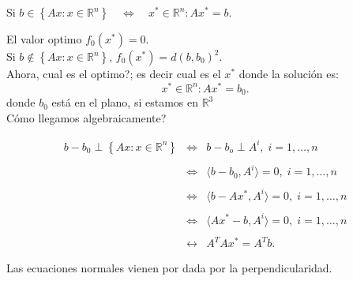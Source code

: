 \begin{ejem}
\begin{center}
\end{center}

Si $b\in \left\{Ax:x\in \mathbb{R}^n\right\}\quad \Leftrightarrow \quad x^* \in \mathbb{R}^n : Ax^* =b.$

El valor optimo $f_0(x^*)=0.$\\

Si $b\notin \left\{Ax:x\in \mathbb{R}^n\right\}$, $f_0(x^*)=d(b,b_0)^2$.\\

Ahora, cual es el optimo?; es decir cual es el $x^*$
donde la solución es:
$$x^*\in \mathbb{R}^n : Ax^*=b_0.$$ donde $b_0$ está en el plano, si estamos en $\mathbb{R}^3$\\

Cómo llegamos algebraicamente?

$$
\begin{array}{rcl}
b-b_0 \perp \left\{Ax:x\in \mathbb{R}^n\right\}&\Leftrightarrow & b-b_o \perp A^i,\; i=1,\ldots,n\\\\  
						 &\Leftrightarrow & \langle b-b_0,A^i\rangle=0,\; i=1,\ldots,n\\\\
							   &\Leftrightarrow& \langle b-Ax^*,A^i\rangle = 0, \; i=1,\ldots,n\\\\
							   &\Leftrightarrow& \langle Ax^*-b,A^i\rangle = 0, \; i=1,\ldots,n\\\\
								   &\leftrightarrow&A^TAx^*=A^Tb.
\end{array}
$$

\end{ejem}
\vspace{1cm}
Las ecuaciones normales vienen por dada por la perpendicularidad.\\\\


